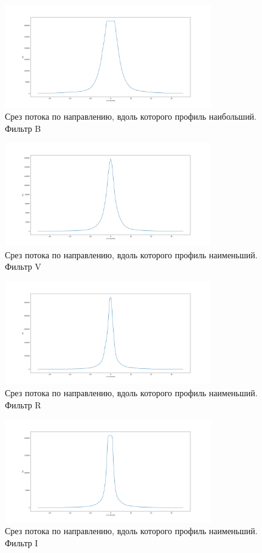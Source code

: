 \documentclass [12pt, a4paper] {article}
\theoremstyle{definition}
\begin{document}
		\begin{figure}
		\centering
			\includegraphics[width = 0.8\textwidth]{B_slice_max.png}
						\caption{Срез потока по направлению, вдоль которого профиль наибольший. Фильтр B}
					\end{figure}
		\begin{figure}
		\centering
			\includegraphics[width = 0.8\textwidth]{V_slice_max.png}
			\caption{Срез потока по направлению, вдоль которого профиль наименьший. Фильтр V}
\end{figure}
\begin{figure}
		\centering
			\includegraphics[width = 0.8\textwidth]{R_slice_min.png}
			\caption{Срез потока по направлению, вдоль которого профиль наименьший. Фильтр R}
		\end{figure}
		\begin{figure}
		\centering
			\includegraphics[width = 0.8\textwidth]{I_slice_min.png}
						\caption{Срез потока по направлению, вдоль которого профиль наименьший. Фильтр I}
		\end{figure}
\end{document}
